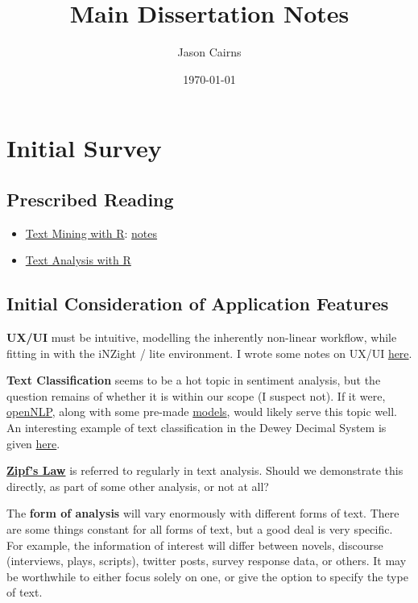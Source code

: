 \documentclass[a4paper, 11pt]{article}
\author{Jason Cairns}
\date{\today}
\title{Main Dissertation Notes}
\begin{document}
\maketitle
\tableofcontents


\section{Initial Survey}
\label{sec:org82ccb39}
\subsection{Prescribed Reading}
\label{sec:org54b4dca}
\begin{itemize}
\item \href{https://www.tidytextmining.com}{Text Mining with R}: \href{./text\_mining\_with\_r.org}{notes}
\item \href{https://m-clark.github.io/text-analysis-with-R/}{Text Analysis with R}
\end{itemize}
\subsection{Initial Consideration of Application Features}
\label{sec:orgf9bd8b1}
\textbf{UX/UI} must be intuitive, modelling the inherently non-linear workflow,
while fitting in with the iNZight / lite environment. I wrote some notes
on UX/UI \href{./ux\_ui.org}{here}.

\textbf{Text Classification} seems to be a hot topic in sentiment analysis, but
the question remains of whether it is within our scope (I suspect not).
If it were, \href{https://cran.r-project.org/web/packages/openNLP/}{openNLP}, along with some pre-made \href{https://datacube.wu.ac.at/src/contrib/}{models}, would likely serve 
this topic well. An interesting example of text classification in the
Dewey Decimal System is given \href{http://creatingdata.us/models/SRP-classifiers}{here}.

\textbf{\href{../reading/Thurner2015 - Understanding Zipfs Law of Word Frequencies through Sample Space Collapse in Sentence Formation.pdf}{Zipf's Law}} is referred to regularly in text analysis. Should we
demonstrate this directly, as part of some other analysis, or not at
all?

The \textbf{form of analysis} will vary enormously with different forms of
text. There are some things constant for all forms of text, but a good
deal is very specific. For example, the information of interest will
differ between novels, discourse (interviews, plays, scripts), twitter
posts, survey response data, or others. It may be worthwhile to either
focus solely on one, or give the option to specify the type of text.
\end{document}
